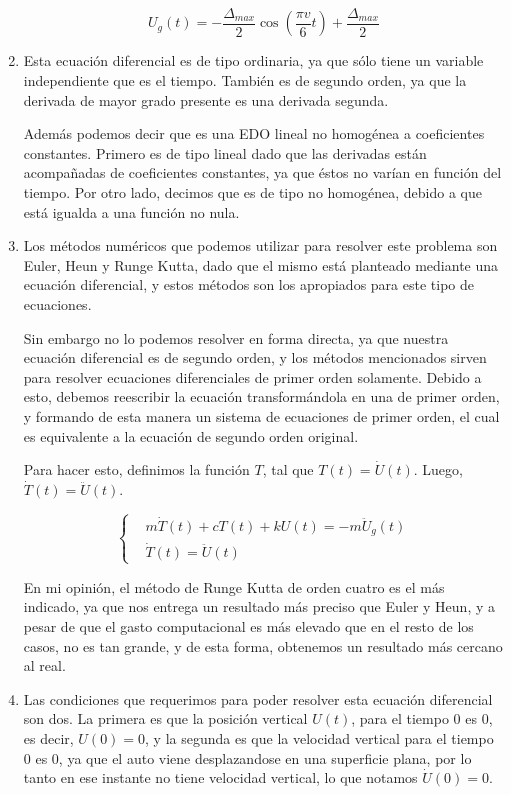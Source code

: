 \documentclass[10pt]{article}
\begin{document}
\begin{enumerate}
\[U_g(t) = -\frac{\Delta_{max}}{2}  \cos (\frac{\pi v}{6}t) + \frac{\Delta_{max}}{2} \]


 \item Esta ecuación diferencial es de tipo ordinaria, ya que sólo tiene un variable 
independiente que es el tiempo. También es de segundo orden, ya que la derivada de mayor
grado presente es una derivada segunda.

Además podemos decir que es una EDO lineal no homogénea a coeficientes constantes. Primero es de tipo lineal dado que las derivadas están
acompañadas de coeficientes constantes, ya que éstos no varían en función del tiempo. Por otro lado, decimos que es de tipo no homogénea,
debido a que está igualda a una función no nula.

 \item Los métodos numéricos que podemos utilizar para resolver este problema son Euler, Heun
y Runge Kutta, dado que el mismo está planteado mediante una ecuación diferencial, y estos
métodos son los apropiados para este tipo de ecuaciones.

Sin embargo no lo podemos resolver en forma directa, ya que nuestra ecuación diferencial es de segundo orden, y los métodos
mencionados sirven para resolver ecuaciones diferenciales de primer orden solamente. Debido a esto, debemos reescribir la ecuación
transformándola en una de primer orden, y formando de esta manera un sistema de ecuaciones de primer orden, el cual es equivalente a la
ecuación de segundo orden original.

Para hacer esto, definimos la función $T$, tal que $T(t) = \dot U(t)$. Luego, $\dot T(t) = \ddot U(t)$.

\[
\begin{cases}
  &m \dot T(t) + c T(t) + k U(t) = -m \ddot U_g(t) \\
  &\dot T(t) = \ddot U(t)
\end{cases}
\]

En mi opinión, el método de Runge Kutta de orden cuatro es el más indicado, ya que nos entrega un resultado más preciso que Euler y Heun, 
y a pesar de que el gasto computacional es más elevado que en el resto de los casos, no es tan grande, y de esta forma, obtenemos un resultado
más cercano al real.

 \item Las condiciones que requerimos para poder resolver esta ecuación diferencial son dos.
La primera es que la posición vertical $U(t)$, para el tiempo $0$ es $0$, es decir, $U(0) = 0$, y la segunda es que
la velocidad vertical para el tiempo $0$ es $0$, ya que el auto viene desplazandose en una
superficie plana, por lo tanto en ese instante no tiene velocidad vertical, lo que notamos $\dot U(0) = 0$.


\end{enumerate}
\end{document}
